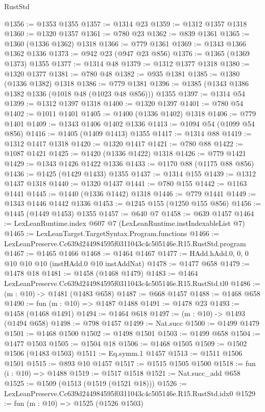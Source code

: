 \begin{lexlean}{RustStd}
\begin{coremodule}
@1356 := @1353 @1355
@1357 := @1314 @23
@1359 := @1312 @1357 @1318
@1360 := @1320 @1357
@1361 := @780 @23
@1362 := @839 @1361
@1365 := @1360 (@1336 @1362) @1318
@1366 := @779 @1361
@1369 := @1343 @1366 @1362 @1336
@1373 := @942 @23 (@947 @23 @856)
@1376 := @1365 (@1369 @1373) @1355
@1377 := @1314 @48
@1379 := @1312 @1377 @1318
@1380 := @1320 @1377
@1381 := @780 @48
@1382 := @935 @1381
@1385 := @1380 (@1336 @1382) @1318
@1386 := @779 @1381
@1396 := @1385 (@1343 @1386 @1382 @1336 (@1018 @48 (@1023 @48 @856))) @1355
@1397 := @1314 @54
@1399 := @1312 @1397 @1318
@1400 := @1320 @1397
@1401 := @780 @54
@1402 := @1011 @1401
@1405 := @1400 (@1336 @1402) @1318
@1406 := @779 @1401
@1409 := @1343 @1406 @1402 @1336
@1413 := @1094 @54 (@1099 @54 @856)
@1416 := @1405 (@1409 @1413) @1355
@1417 := @1314 @88
@1419 := @1312 @1417 @1318
@1420 := @1320 @1417
@1421 := @780 @88
@1422 := @1087 @1421
@1425 := @1420 (@1336 @1422) @1318
@1426 := @779 @1421
@1429 := @1343 @1426 @1422 @1336
@1433 := @1170 @88 (@1175 @88 @856)
@1436 := @1425 (@1429 @1433) @1355
@1437 := @1314 @155
@1439 := @1312 @1437 @1318
@1440 := @1320 @1437
@1441 := @780 @155
@1442 := @1163 @1441
@1445 := @1440 (@1336 @1442) @1318
@1446 := @779 @1441
@1449 := @1343 @1446 @1442 @1336
@1453 := @1245 @155 (@1250 @155 @856)
@1456 := @1445 (@1449 @1453) @1355
@1457 := @640 @7
@1458 := @639 @1457
@1464 := LexLeanRuntime.index @607 @7 (LexLeanRuntime.instIndexableList @7)
@1465 := LexLeanTarget.TargetSyntax.Program.functions
@1466 := LexLeanPreserve.Cc639d244984595f0311043c4c505146e.R15.RustStd.program
@1467 := @1465 @1466
@1468 := @1464 @1467
@1477 := HAdd.hAdd.{0, 0, 0} @10 @10 @10 (instHAdd.{0} @10 instAddNat)
@1478 := @1477 @658
@1479 := @1478 @18
@1481 := @1458 (@1468 @1479)
@1483 := @1464 LexLeanPreserve.Cc639d244984595f0311043c4c505146e.R15.RustStd.tl0
@1486 := (m : @10) -> @1481 (@1483 @658)
@1487 := @668 @1457
@1488 := @1468 @658
@1490 := fun (m : @10) => @1487 @1488
@1491 := @1478 @23
@1493 := @1458 (@1468 @1491)
@1494 := @1464 @618
@1497 := (m : @10) -> @1493 (@1494 @658)
@1498 := @798 @1457
@1499 := Nat.succ
@1500 := @1499 @1479
@1501 := @1468 @1500
@1502 := @1498 @1501
@1503 := @1499 @658
@1504 := @1477 @1503
@1505 := @1504 @18
@1506 := @1468 @1505
@1509 := @1502 @1506 (@1483 @1503)
@1511 := Eq.symm.{1} @1457
@1513 := @1511 @1506 @1501
@1515 := @893 @10 @1457
@1517 := @1515 @1505 @1500
@1518 := fun (i : @10) => @1488
@1519 := @1517 @1518
@1521 := Nat.succ_add @658
@1525 := @1509 (@1513 (@1519 (@1521 @18)))
@1526 := LexLeanPreserve.Cc639d244984595f0311043c4c505146e.R15.RustStd.idx0
@1529 := fun (m : @10) => @1525 (@1526 @1503)

\end{coremodule}
\end{lexlean}
